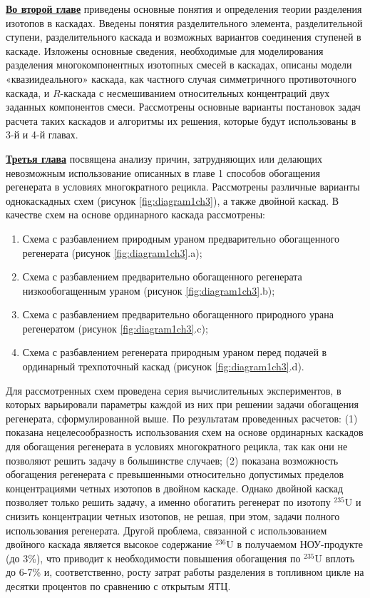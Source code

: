 \underline{\textbf{Во второй главе}} приведены основные понятия и определения теории разделения изотопов в каскадах. Введены понятия  разделительного элемента, разделительной ступени, разделительного каскада и возможных вариантов соединения ступеней в каскаде. Изложены основные сведения, необходимые для моделирования разделения многокомпонентных изотопных смесей в каскадах, описаны модели «квазиидеального» каскада, как частного случая симметричного противоточного каскада, и $R$-каскада с несмешиванием относительных концентраций двух заданных компонентов смеси. Рассмотрены основные варианты постановок задач расчета таких каскадов и алгоритмы их решения, которые будут использованы в 3-й и 4-й главах. 

\underline{\textbf{Третья глава}} посвящена анализу причин, затрудняющих или делающих невозможным использование описанных в главе 1 способов обогащения регенерата в условиях многократного рецикла. Рассмотрены различные варианты однокаскадных схем (рисунок \ref{fig:diagram1ch3}), а также двойной каскад. В качестве схем на основе ординарного каскада рассмотрены:

\begin{enumerate}
  \item Схема с разбавлением природным ураном предварительно обогащенного регенерата (рисунок \ref{fig:diagram1ch3}.a);
  \item Схема с разбавлением предварительно обогащенного регенерата низкообогащенным ураном (рисунок \ref{fig:diagram1ch3}.b);
  \item Схема с разбавлением предварительно обогащенного природного урана регенератом (рисунок \ref{fig:diagram1ch3}.c);
  \item Схема с разбавлением регенерата природным ураном перед подачей в ординарный трехпоточный каскад (рисунок \ref{fig:diagram1ch3}.d).
\end{enumerate}

Для рассмотренных схем проведена серия вычислительных экспериментов, в которых варьировали параметры каждой из них при решении задачи обогащения регенерата, сформулированной выше. По результатам проведенных расчетов: (1) показана нецелесообразность использования схем на основе ординарных каскадов для обогащения регенерата в условиях многократного рецикла, так как они не позволяют решить задачу в большинстве случаев; (2) показана возможность обогащения регенерата с превышенными относительно допустимых пределов концентрациями четных изотопов в двойном каскаде. Однако двойной каскад позволяет только решить задачу, а именно обогатить регенерат по изотопу $^{235}$U и снизить концентрации четных изотопов, не решая, при этом, задачи полного использования регенерата. Другой проблема, связанной с использованием двойного каскада является высокое содержание $^{236}$U в получаемом НОУ-продукте (до 3\%), что приводит к необходимости повышения обогащения по $^{235}$U вплоть до 6-7\% и, соответственно, росту затрат работы разделения в топливном цикле на десятки процентов по сравнению с открытым ЯТЦ.

